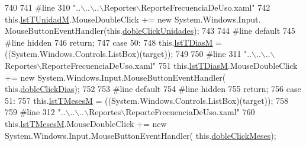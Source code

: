\begin{DoxyCode}
740             
741 \textcolor{preprocessor}{            #line 310 "..\(\backslash\)..\(\backslash\)..\(\backslash\)Reportes\(\backslash\)ReporteFrecuenciaDeUso.xaml"}
742 \textcolor{preprocessor}{}            this.\hyperlink{class_proyecto___integrador__3_1_1_reportes_1_1_reporte_frecuencia_de_uso_ab12e78b5f637eefdfde63fba310cfaf5}{lstTUnidadM}.MouseDoubleClick += \textcolor{keyword}{new} System.Windows.Input.
      MouseButtonEventHandler(this.\hyperlink{class_proyecto___integrador__3_1_1_reportes_1_1_reporte_frecuencia_de_uso_a85f2c2307781a5f965e7785e2ad097c9}{dobleClickUnidades});
743             
744 \textcolor{preprocessor}{            #line default}
745 \textcolor{preprocessor}{}\textcolor{preprocessor}{            #line hidden}
746 \textcolor{preprocessor}{}            \textcolor{keywordflow}{return};
747             \textcolor{keywordflow}{case} 50:
748             this.\hyperlink{class_proyecto___integrador__3_1_1_reportes_1_1_reporte_frecuencia_de_uso_aef12e55c0fc89f85f601163eda0ffac4}{lstTDiasM} = ((System.Windows.Controls.ListBox)(target));
749             
750 \textcolor{preprocessor}{            #line 311 "..\(\backslash\)..\(\backslash\)..\(\backslash\)Reportes\(\backslash\)ReporteFrecuenciaDeUso.xaml"}
751 \textcolor{preprocessor}{}            this.\hyperlink{class_proyecto___integrador__3_1_1_reportes_1_1_reporte_frecuencia_de_uso_aef12e55c0fc89f85f601163eda0ffac4}{lstTDiasM}.MouseDoubleClick += \textcolor{keyword}{new} System.Windows.Input.MouseButtonEventHandler(
      this.\hyperlink{class_proyecto___integrador__3_1_1_reportes_1_1_reporte_frecuencia_de_uso_a2ab966196c9bc681df237775e5084d8d}{dobleClickDias});
752             
753 \textcolor{preprocessor}{            #line default}
754 \textcolor{preprocessor}{}\textcolor{preprocessor}{            #line hidden}
755 \textcolor{preprocessor}{}            \textcolor{keywordflow}{return};
756             \textcolor{keywordflow}{case} 51:
757             this.\hyperlink{class_proyecto___integrador__3_1_1_reportes_1_1_reporte_frecuencia_de_uso_a54c8c7cb624219a3e3f23d61eded187b}{lstTMesesM} = ((System.Windows.Controls.ListBox)(target));
758             
759 \textcolor{preprocessor}{            #line 312 "..\(\backslash\)..\(\backslash\)..\(\backslash\)Reportes\(\backslash\)ReporteFrecuenciaDeUso.xaml"}
760 \textcolor{preprocessor}{}            this.\hyperlink{class_proyecto___integrador__3_1_1_reportes_1_1_reporte_frecuencia_de_uso_a54c8c7cb624219a3e3f23d61eded187b}{lstTMesesM}.MouseDoubleClick += \textcolor{keyword}{new} System.Windows.Input.MouseButtonEventHandler(
      this.\hyperlink{class_proyecto___integrador__3_1_1_reportes_1_1_reporte_frecuencia_de_uso_a50be2c40af6717361795d2ca8e9b6bf3}{dobleClickMeses});

\end{DoxyCode}
